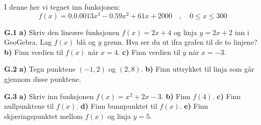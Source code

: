 I denne
 her vi tegnet inn funksjonen:
\[ f(x)=0.0.0013x^3-0.59x^2+61x+2000\quad,\quad0\leq x\leq300 \]

\newpage
{}
\textbf{G.1}\bs
\textbf{a)} Skriv den lineære funksjonen $ {f(x)=2x+4} $ og linja $ {y=2x+2} $ inn i GeoGebra. Lag $ f(x) $ blå og $ y $ grønn. Hva ser du ut ifra grafen til de to linjene?\bs
\textbf{b)} Finn verdien til $ f(x) $ når $ {x=4} $.\bs
\textbf{c)} Finn verdien til $ y $ når $ {x=-3} $.\vsk

\textbf{G.2}\bs
\textbf{a)} Tegn punktene $ (-1,2) $ og $ (2,8) $.\bs
\textbf{b)} Finn uttrykket til linja som går gjennom disse punktene.\vsk

\textbf{G.3}\bs
\textbf{a)} Skriv inn funksjonen $ {f(x)=x^2+2x-3} $.\bs
\textbf{b)} Finn $ f(4) $.\bs
\textbf{c)} Finn nullpunktene til $ f(x) $.\bs
\textbf{d)} Finn bunnpunktet til $ f(x) $.\bs
\textbf{e)} Finn skjæringspunktet mellom $ f(x) $ og linja $ y=5 $.





